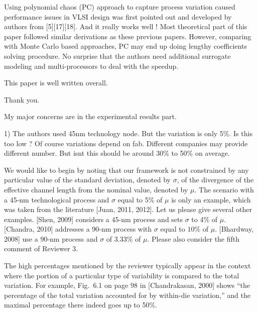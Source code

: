 \begin{reviewer}
Using polynomial chaos (PC) approach to capture process variation caused performance issues in VLSI design was first pointed out and developed by authors from [5][17][18]. And it really works well ! Most theoretical part of this paper followed similar derivations as these previous papers. However, comparing with Monte Carlo based approaches, PC may end up doing  lengthy  coefficients solving procedure. No surprise that the authors need additional surrogate modeling and multi-processors to deal with the speedup.

This paper is well written overall.
\end{reviewer}
\begin{authors}
Thank you.
\end{authors}

\begin{reviewer}
My major concerns are in the experimental results part.

1) The authors used 45nm technology node. But the variation is only 5\%. Is this too low ? Of course variations depend on fab. Different companies may provide different number. But isnt this should be around 30\% to 50\% on average.
\end{reviewer}
\begin{authors}
We would like to begin by noting that our framework is not constrained by any particular value of the standard deviation, denoted by $\sigma$, of the divergence of the effective channel length from the nominal value, denoted by $\mu$.
The scenario with a 45-nm technological process and $\sigma$ equal to 5\% of $\mu$ is only an example, which was taken from the literature [Juan, 2011, 2012].
Let us please give several other examples.
[Shen, 2009] considers a 45-nm process and sets $\sigma$ to 4\% of $\mu$.
[Chandra, 2010] addresses a 90-nm process with $\sigma$ equal to $10\%$ of $\mu$.
[Bhardway, 2008] use a 90-nm process and $\sigma$ of 3.33\% of $\mu$.
Please also consider the fifth comment of Reviewer 3.

The high percentages mentioned by the reviewer typically appear in the context where the portion of a particular type of variability is compared to the total variation.
For example, Fig.~6.1 on page 98 in [Chandrakasan, 2000] shows ``the percentage of the total variation accounted for by within-die variation,'' and the maximal percentage there indeed goes up to 50\%.

\end{authors}

